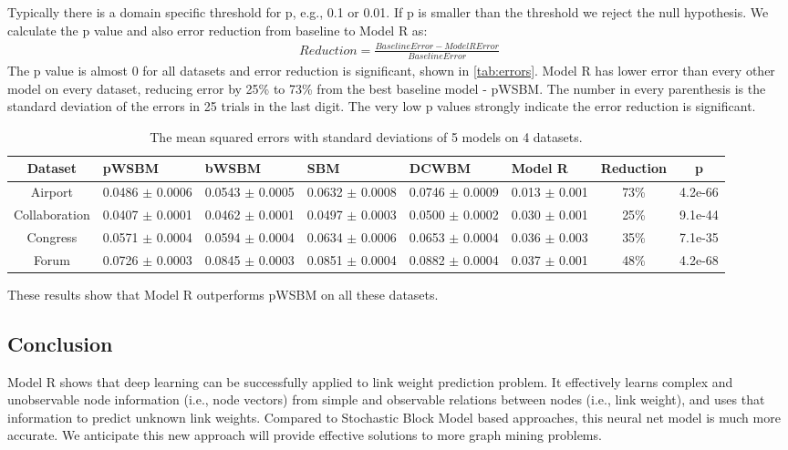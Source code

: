 \documentclass{article}
\begin{document}
Typically there is a domain specific threshold for p, e.g., 0.1 or 0.01. If p is smaller than the threshold we reject the null hypothesis.
We calculate the p value and also error reduction from baseline to Model R as:
\begin{align*}
Reduction = \frac{BaselineError - ModelRError}{BaselineError}
\end{align*}
The p value is almost 0 for all datasets and error reduction is significant,
shown in \autoref{tab:errors}.
Model R has lower error than every other model on every dataset,
reducing error by 25\% to 73\% from the best baseline model - pWSBM.
The number in every parenthesis is the standard deviation of the errors in 25 trials in the last digit. The very low p values strongly indicate the error reduction is significant.
\begin{table}[!htb]\centering
	\caption{
		The mean squared errors with standard deviations of 5 models on 4 datasets.
	}
	\begin{tabularx}{\textwidth}{|c|X|X|X|X|X|c|c|} \hline \rowcolor{blue!40}
		Dataset & pWSBM & bWSBM & SBM & DCWBM & Model R & Reduction & p \\ \hline
		Airport & 0.0486 $ \pm $ 0.0006 & 0.0543 $ \pm $ 0.0005 & 0.0632 $ \pm $ 0.0008 & 0.0746 $ \pm $ 0.0009 & 0.013 $ \pm $ 0.001 & 73\% & 4.2e-66 \\ \hline
		Collaboration & 0.0407 $ \pm $ 0.0001 & 0.0462 $ \pm $ 0.0001 & 0.0497 $ \pm $ 0.0003 & 0.0500 $ \pm $ 0.0002 & 0.030 $ \pm $ 0.001 & 25\% & 9.1e-44 \\ \hline
		Congress & 0.0571 $ \pm $ 0.0004 & 0.0594 $ \pm $ 0.0004 & 0.0634 $ \pm $ 0.0006 & 0.0653 $ \pm $ 0.0004 & 0.036 $ \pm $ 0.003 & 35\% & 7.1e-35 \\ \hline
		Forum & 0.0726 $ \pm $ 0.0003 & 0.0845 $ \pm $ 0.0003 & 0.0851 $ \pm $ 0.0004 & 0.0882 $ \pm $ 0.0004 & 0.037 $ \pm $ 0.001 & 48\% & 4.2e-68 \\ \hline
	\end{tabularx}
	\label{tab:errors}
\end{table}
These results show that Model R outperforms pWSBM on all these datasets.

\subsection{Conclusion}
Model R shows that deep learning can be successfully applied to link weight prediction problem.
It effectively learns complex and unobservable node information (i.e., node vectors) from simple and observable relations between nodes (i.e., link weight),
and uses that information to predict unknown link weights.
Compared to Stochastic Block Model based approaches,
this neural net model is much more accurate.
We anticipate this new approach will provide effective solutions to more
graph mining problems.
\end{document}
